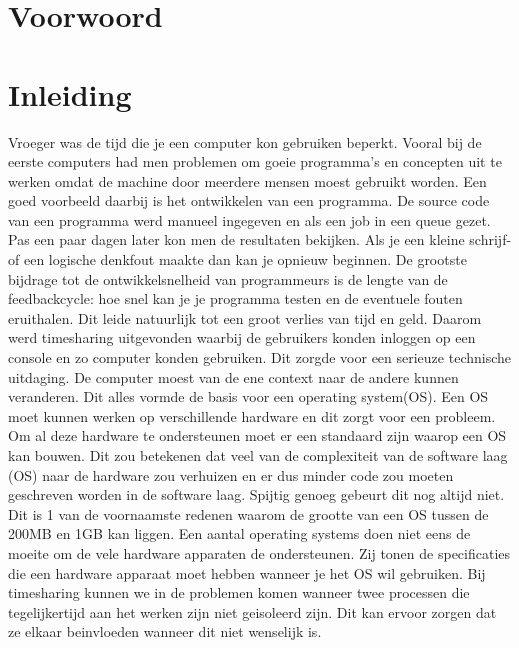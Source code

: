 \documentclass[pdftex,a4paper,12pt,twoside]{report}
\begin{document}
\begin{abstract}
  \lipsum[1-4]
\end{abstract}

\chapter*{Voorwoord}
\label{ch:voorwoord}

\lipsum[5-6]

\tableofcontents



\chapter{Inleiding}
\label{ch:inleiding}

Vroeger was de tijd die je een computer kon gebruiken beperkt. Vooral bij de eerste computers had men problemen om goeie programma's en concepten uit te werken omdat de machine door meerdere mensen moest gebruikt worden. Een goed voorbeeld daarbij is het ontwikkelen van een programma. De source code van een programma werd manueel ingegeven en als een job in een queue gezet. Pas een paar dagen later kon men de resultaten bekijken. Als je een kleine schrijf- of een logische denkfout maakte dan kan je opnieuw beginnen. De grootste bijdrage tot de ontwikkelsnelheid van programmeurs is de lengte van de feedbackcycle: hoe snel kan je je programma testen en de eventuele fouten eruithalen. Dit leide natuurlijk tot een groot verlies van tijd en geld. Daarom werd timesharing uitgevonden waarbij de gebruikers konden inloggen op een console en zo computer konden gebruiken. Dit zorgde voor een serieuze technische uitdaging. De computer moest van de ene context naar de andere kunnen veranderen. Dit alles vormde de basis voor een operating system(OS). Een OS moet kunnen werken op verschillende hardware en dit zorgt voor een probleem. Om al deze hardware te ondersteunen moet er een standaard zijn waarop een OS kan bouwen. Dit zou betekenen dat veel van de complexiteit van de software laag (OS) naar de hardware zou verhuizen en er dus minder code zou moeten geschreven worden in de software laag. Spijtig genoeg gebeurt dit nog altijd niet. Dit is 1 van de voornaamste redenen waarom de grootte van een OS tussen de 200MB en 1GB kan liggen. Een aantal operating systems doen niet eens de moeite om de vele hardware apparaten de ondersteunen. Zij tonen de specificaties die een hardware apparaat moet hebben wanneer je het OS wil gebruiken. Bij timesharing kunnen we in de problemen komen wanneer twee processen die tegelijkertijd aan het werken zijn niet geisoleerd zijn. Dit kan ervoor zorgen dat ze elkaar beinvloeden wanneer dit niet wenselijk is.
\end{document}
